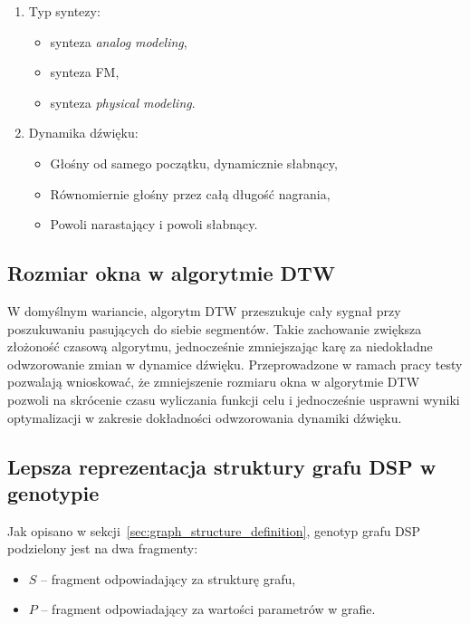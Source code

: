 \begin{enumerate}
  \item Typ syntezy:
  \begin{itemize}
    \item synteza \textit{analog modeling},
    \item synteza FM,
    \item synteza \textit{physical modeling}.
  \end{itemize}
  \item Dynamika dźwięku:
    \begin{itemize}
      \item Głośny od samego początku, dynamicznie słabnący,
      \item Równomiernie głośny przez całą długość nagrania,
      \item Powoli narastający i powoli słabnący.
    \end{itemize}
\end{enumerate}



\subsection{Rozmiar okna w algorytmie DTW}

W domyślnym wariancie, algorytm DTW przeszukuje cały sygnał
przy poszukuwaniu pasujących do siebie segmentów. Takie
zachowanie zwiększa złożoność czasową algorytmu, jednocześnie
zmniejszając karę za niedokładne odwzorowanie zmian w dynamice dźwięku.
Przeprowadzone w ramach pracy testy pozwalają wnioskować, że zmniejszenie
rozmiaru okna w algorytmie DTW pozwoli na skrócenie czasu
wyliczania funkcji celu i jednocześnie usprawni wyniki optymalizacji
w zakresie dokładności odwzorowania dynamiki dźwięku.

\subsection{Lepsza reprezentacja struktury grafu DSP w genotypie}

Jak opisano w sekcji~\ref{sec:graph_structure_definition}, genotyp grafu DSP
podzielony jest na dwa fragmenty:

\begin{itemize}
  \item $S$ -- fragment odpowiadający za strukturę grafu,
  \item $P$ -- fragment odpowiadający za wartości parametrów w grafie.
\end{itemize}

